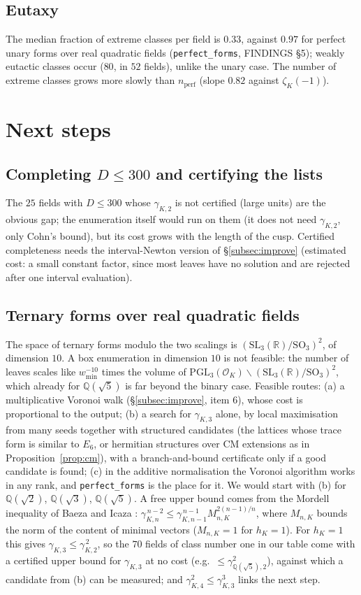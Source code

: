 \documentclass[11pt]{amsart}
\theoremstyle{definition}
\theoremstyle{remark}
\newcommand{\Q}{\mathbb{Q}}
\newcommand{\R}{\mathbb{R}}
\newcommand{\OK}{\mathcal{O}_K}
\newcommand{\PGL}{\mathrm{PGL}}
\newcommand{\SL}{\mathrm{SL}}
\newcommand{\gK}{\gamma_{K,2}}
\newcommand{\nperf}{n_{\mathrm{perf}}}
\begin{document}
\subsection{Eutaxy}
The median fraction of extreme classes per field is $0.33$, against $0.97$ for perfect unary
forms over real quadratic fields (\texttt{perfect\_forms}, FINDINGS \S5); weakly eutactic classes
occur ($80$, in $52$ fields), unlike the unary case.  The number of extreme classes grows more
slowly than $\nperf$ (slope $0.82$ against $\zeta_K(-1)$).

\section{Next steps}\label{sec:next}

\subsection{Completing $D\le300$ and certifying the lists}
The $25$ fields with $D\le300$ whose $\gK$ is not certified (large units) are the obvious
gap; the enumeration itself would run on them (it does not need $\gK$, only Cohn's bound), but
its cost grows with the length of the cusp.  Certified completeness needs the interval-Newton
version of \S\ref{subsec:improve} (estimated cost: a small constant factor, since most leaves
have no solution and are rejected after one interval evaluation).

\subsection{Ternary forms over real quadratic fields}
The space of ternary forms modulo the two scalings is $(\SL_3(\R)/\mathrm{SO}_3)^2$, of
dimension $10$.  A box enumeration in dimension $10$ is not feasible: the number of leaves
scales like $w_{\min}^{-10}$ times the volume of $\PGL_3(\OK)\backslash(\SL_3(\R)/\mathrm{SO}_3)^2$,
which already for $\Q(\sqrt5)$ is far beyond the binary case.  Feasible routes: (a) a
multiplicative Voronoi walk (\S\ref{subsec:improve}, item 6), whose cost is proportional to
the output; (b) a search for $\gamma_{K,3}$ alone, by local maximisation from many seeds
together with structured candidates (the lattices whose trace form is similar to $E_6$, or
hermitian structures over CM extensions as in Proposition~\ref{prop:cm}), with a
branch-and-bound certificate only if a good candidate is found; (c) in the additive
normalisation the Voronoi algorithm works in any rank, and \texttt{perfect\_forms} is the place
for it.  We would start with (b) for $\Q(\sqrt2)$, $\Q(\sqrt3)$, $\Q(\sqrt5)$.  A free upper
bound comes from the Mordell inequality of Baeza and Icaza \cite[\S3]{BI97}:
$\gamma_{K,n}^{\,n-2}\le\gamma_{K,n-1}^{\,n-1}M_{n,K}^{2(n-1)/n}$, where $M_{n,K}$ bounds the norm of
the content of minimal vectors ($M_{n,K}=1$ for $h_K=1$).  For $h_K=1$ this gives
$\gamma_{K,3}\le\gamma_{K,2}^{\,2}$, so the $70$ fields of class number one in our table come
with a certified upper bound for $\gamma_{K,3}$ at no cost (e.g.\ $\le\gamma_{\Q(\sqrt5),2}^2$),
against which a candidate from (b) can be measured; and $\gamma_{K,4}^2\le\gamma_{K,3}^3$ links
the next step.
\end{document}
